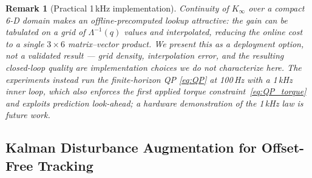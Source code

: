 \documentclass[journal]{IEEEtran}
\newtheorem{remark}{Remark}
\newcommand{\Laminv}{\Lambda^{-1}(q)}
\begin{document}
\begin{remark}[Practical 1\,kHz implementation]
Continuity of $K_\infty$ over a compact 6-D domain makes an
offline-precomputed lookup attractive: the gain can be tabulated on a
grid of $\Laminv$ values and interpolated, reducing the online cost to a
single $3\times6$ matrix--vector product. We present this as a deployment
\emph{option}, not a validated result --- grid density, interpolation
error, and the resulting closed-loop quality are implementation choices
we do not characterize here. The experiments instead run the
finite-horizon QP \eqref{eq:QP} at 100\,Hz with a 1\,kHz inner loop,
which also enforces the first applied torque constraint~\eqref{eq:QP_torque} and exploits
prediction look-ahead; a hardware demonstration of the 1\,kHz law is future work.
\end{remark}

\subsection{Kalman Disturbance Augmentation for Offset-Free Tracking}\label{sec:layer2c}
\end{document}

